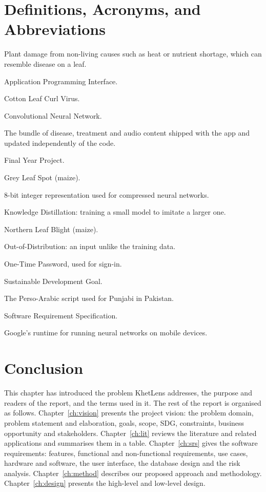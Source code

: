 \section{Definitions, Acronyms, and Abbreviations}
\label{sec:acronyms}
\begin{description}[style=nextline, leftmargin=0pt, itemsep=1pt]
  \item[Abiotic stress] Plant damage from non-living causes such as heat or nutrient shortage, which can resemble disease on a leaf.
  \item[API] Application Programming Interface.
  \item[CLCuV] Cotton Leaf Curl Virus.
  \item[CNN] Convolutional Neural Network.
  \item[Content pack] The bundle of disease, treatment and audio content shipped with the app and updated independently of the code.
  \item[FYP] Final Year Project.
  \item[GLS] Grey Leaf Spot (maize).
  \item[INT8] 8-bit integer representation used for compressed neural networks.
  \item[KD] Knowledge Distillation: training a small model to imitate a larger one.
  \item[NLB] Northern Leaf Blight (maize).
  \item[OOD] Out-of-Distribution: an input unlike the training data.
  \item[OTP] One-Time Password, used for sign-in.
  \item[SDG] Sustainable Development Goal.
  \item[Shahmukhi] The Perso-Arabic script used for Punjabi in Pakistan.
  \item[SRS] Software Requirement Specification.
  \item[TFLite / LiteRT] Google's runtime for running neural networks on mobile devices.
\end{description}

\section{Conclusion}
This chapter has introduced the problem KhetLens addresses, the purpose and readers of the report, and the terms used in it. The rest of the report is organised as follows. Chapter~\ref{ch:vision} presents the project vision: the problem domain, problem statement and elaboration, goals, scope, SDG, constraints, business opportunity and stakeholders. Chapter~\ref{ch:lit} reviews the literature and related applications and summarises them in a table. Chapter~\ref{ch:srs} gives the software requirements: features, functional and non-functional requirements, use cases, hardware and software, the user interface, the database design and the risk analysis. Chapter~\ref{ch:method} describes our proposed approach and methodology. Chapter~\ref{ch:design} presents the high-level and low-level design.
